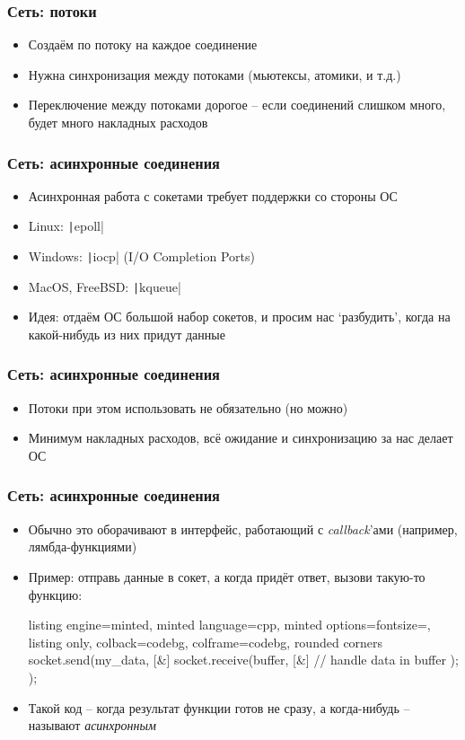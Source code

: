 \documentclass[10pt]{beamer}
\begin{document}
\begin{frame}[fragile]
\frametitle{Сеть: потоки}
\begin{itemize}
\item Создаём по потоку на каждое соединение
\pause
\item Нужна синхронизация между потоками (мьютексы, атомики, и т.д.)
\pause
\item Переключение между потоками дорогое -- если соединений слишком много, будет много накладных расходов
\end{itemize}
\end{frame}

\begin{frame}[fragile]
\frametitle{Сеть: асинхронные соединения}
\begin{itemize}
\item Асинхронная работа с сокетами требует поддержки со стороны ОС
\pause
\item Linux: \texttt|epoll|
\item Windows: \texttt|iocp| (I/O Completion Ports)
\item MacOS, FreeBSD: \texttt|kqueue|
\pause
\item Идея: отдаём ОС большой набор сокетов, и просим нас `разбудить', когда на какой-нибудь из них придут данные
\end{itemize}
\end{frame}

\begin{frame}[fragile]
\frametitle{Сеть: асинхронные соединения}
\begin{itemize}
\item Потоки при этом использовать не обязательно (но можно)
\pause
\item Минимум накладных расходов, всё ожидание и синхронизацию за нас делает ОС
\end{itemize}
\end{frame}

\begin{frame}[fragile]
\frametitle{Сеть: асинхронные соединения}
\begin{itemize}
\item Обычно это оборачивают в интерфейс, работающий с \textit{callback}'ами (например, лямбда-функциями)
\pause
\item Пример: отправь данные в сокет, а когда придёт ответ, вызови такую-то функцию:
\begin{tcblisting}{listing engine=minted, minted language=cpp, minted options={fontsize=\scriptsize}, listing only, colback=codebg, colframe=codebg, rounded corners}
socket.send(my_data, [&]{
  socket.receive(buffer, [&]{
    // handle data in buffer
  });
});
\end{tcblisting}
\pause
\item Такой код -- когда результат функции готов не сразу, а когда-нибудь -- называют \textit{асинхронным}
\end{itemize}
\end{frame}
\end{document}
